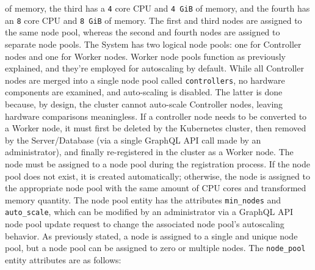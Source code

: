 of memory, the third has a \texttt{4} core CPU and \texttt{4 GiB} of memory, and
the fourth has an \texttt{8} core CPU and \texttt{8 GiB} of memory. The first and
third nodes are assigned to the same node pool, whereas the second and fourth
nodes are assigned to separate node pools.
\newline
The System has two logical node pools: one for Controller nodes and one for
Worker nodes. Worker node pools function as previously explained, and they're
employed for autoscaling by default. While all Controller nodes are merged into a
single node pool called \texttt{controllers}, no hardware components are examined,
and auto-scaling is disabled. The latter is done because, by design, the cluster
cannot auto-scale Controller nodes, leaving hardware comparisons meaningless. If
a controller node needs to be converted to a Worker node, it must first be
deleted by the Kubernetes cluster, then removed by the Server/Database (via a
single GraphQL API call made by an administrator), and finally re-registered in
the cluster as a Worker node.
\newline
The node must be assigned to a node pool during the registration process. If the
node pool does not exist, it is created automatically; otherwise, the node is assigned
to the appropriate node pool with the same amount of CPU cores and transformed memory
quantity.
\newline
The node pool entity has the attributes \texttt{min\_nodes} and \texttt{auto\_scale},
which can be modified by an administrator via a GraphQL API node pool update request
to change the associated node pool's autoscaling behavior.
\newline
As previously stated, a node is assigned to a single and unique node pool, but a
node pool can be assigned to zero or multiple nodes.
\newline
The \texttt{node\_pool} entity attributes are as follows:

